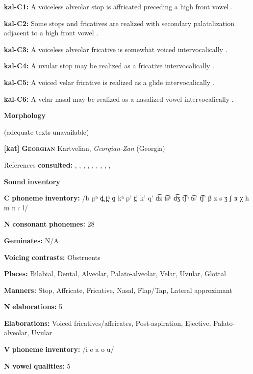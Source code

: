 \textbf{kal-C1:} A voiceless alveolar stop is affricated preceding a high front vowel \citep[333]{Fortescue1984}.

\textbf{kal-C2:} Some stops and fricatives are realized with secondary palatalization adjacent to a high front vowel \citep[333]{Fortescue1984}.

\textbf{kal-C3:} A voiceless alveolar fricative is somewhat voiced intervocalically \citep[334]{Fortescue1984}.

\textbf{kal-C4:} A uvular stop may be realized as a fricative intervocalically \citep[333]{Fortescue1984}.

\textbf{kal-C5:} A voiced velar fricative is realized as a glide intervocalically \citep[334]{Fortescue1984}.

\textbf{kal-C6:} A velar nasal may be realized as a nasalized vowel intervocalically \citep[334]{Fortescue1984}.

\textbf{Morphology}

(adequate texts unavailable)

\textbf{[kat]}   \textbf{\textsc{Georgian}}    Kartvelian, \textit{Georgian-Zan} (Georgia)

References \textbf{consulted:} \citet{Aronson1990}, \citet{Aronson1991}, \citet{Butskhrikidze2002}, \citet{Chitoran1998}, \citet{Hewitt1995}, \citet{JunEtAl2006}, \citet{ShostedChikovani2006}, \citet{SkopeteasFéry2010}, \citet{Vicenek2010}, \citet{Vogt1958}

\textbf{Sound} \textbf{inventory}

\textbf{C} \textbf{phoneme} \textbf{inventory:} /b pʰ d̪ t̪ʰ ɡ kʰ p’ t̪’ k’ q’ d͡z t͡sʰ d͡ʒ t͡ʃʰ t͡s’ t͡ʃ’ β z s ʒ ʃ ʁ χ h m n ɾ l/

\textbf{N} \textbf{consonant} \textbf{phonemes:} 28

\textbf{Geminates:} N/A

\textbf{Voicing} \textbf{contrasts:} Obstruents

\textbf{Places:} Bilabial, Dental, Alveolar, Palato-alveolar, Velar, Uvular, Glottal

\textbf{Manners:} Stop, Affricate, Fricative, Nasal, Flap/Tap, Lateral approximant

\textbf{N} \textbf{elaborations:} 5

\textbf{Elaborations:} Voiced fricatives/affricates, Post-aspiration, Ejective, Palato-alveolar, Uvular

\textbf{V} \textbf{phoneme} \textbf{inventory:} /i e a o u/

\textbf{N} \textbf{vowel} \textbf{qualities:} 5

